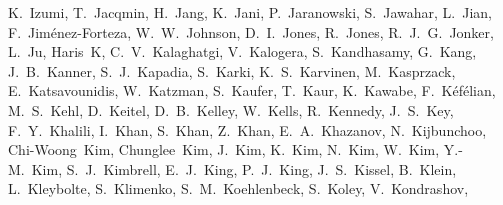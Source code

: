 {K.~Izumi,  %
T.~Jacqmin, %
H.~Jang,  %
K.~Jani,  %
P.~Jaranowski, %
S.~Jawahar,  %
L.~Jian,  %
F.~Jim\'enez-Forteza,  %
W.~W.~Johnson,  %
D.~I.~Jones,  %
R.~Jones,  %
R.~J.~G.~Jonker, %
L.~Ju,  %
Haris~K,  %
C.~V.~Kalaghatgi,  %
V.~Kalogera,  %
S.~Kandhasamy,  %
G.~Kang,  %
J.~B.~Kanner,  %
S.~J.~Kapadia,  %
S.~Karki,  %
K.~S.~Karvinen,	%
M.~Kasprzack,  %
E.~Katsavounidis,  %
W.~Katzman,  %
S.~Kaufer,  %
T.~Kaur,  %
K.~Kawabe,  %
F.~K\'ef\'elian, %
M.~S.~Kehl,  %
D.~Keitel,  %
D.~B.~Kelley,  %
W.~Kells,  %
R.~Kennedy,  %
J.~S.~Key,  %
F.~Y.~Khalili,  %
I.~Khan, %
S.~Khan,  %
Z.~Khan,  %
E.~A.~Khazanov,  %
N.~Kijbunchoo,  %
Chi-Woong~Kim,  %
Chunglee~Kim,  %
J.~Kim,  %
K.~Kim,  %
N.~Kim,  %
W.~Kim,  %
Y.-M.~Kim,  %
S.~J.~Kimbrell,  %
E.~J.~King,  %
P.~J.~King,  %
J.~S.~Kissel,  %
B.~Klein,  %
L.~Kleybolte,  %
S.~Klimenko,  %
S.~M.~Koehlenbeck,  %
S.~Koley, %
V.~Kondrashov,  %
}
